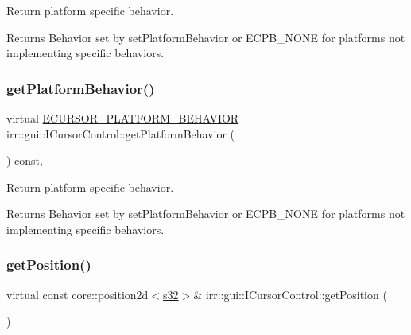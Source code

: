 Return platform specific behavior. 

\begin{DoxyReturn}{Returns}
Behavior set by set\+Platform\+Behavior or E\+C\+P\+B\+\_\+\+N\+O\+NE for platforms not implementing specific behaviors. 
\end{DoxyReturn}
\mbox{\label{classirr_1_1gui_1_1ICursorControl_aad19b5b02de0b8bc476c66b152b745c4}} 
\subsubsection{\texorpdfstring{get\+Platform\+Behavior()}{getPlatformBehavior()}\hspace{0.1cm}{\footnotesize\ttfamily [2/2]}}
{\footnotesize\ttfamily virtual \hyperlink{namespaceirr_1_1gui_abbd186f9cfba2f805d98248df226acef}{E\+C\+U\+R\+S\+O\+R\+\_\+\+P\+L\+A\+T\+F\+O\+R\+M\+\_\+\+B\+E\+H\+A\+V\+I\+OR} irr\+::gui\+::\+I\+Cursor\+Control\+::get\+Platform\+Behavior (\begin{DoxyParamCaption}{ }\end{DoxyParamCaption}) const\hspace{0.3cm}{\ttfamily [inline]}, {\ttfamily [virtual]}}



Return platform specific behavior. 

\begin{DoxyReturn}{Returns}
Behavior set by set\+Platform\+Behavior or E\+C\+P\+B\+\_\+\+N\+O\+NE for platforms not implementing specific behaviors. 
\end{DoxyReturn}
\mbox{\label{classirr_1_1gui_1_1ICursorControl_a65d9f6e734baa02be69b7e9f5fbdd565}} 
\subsubsection{\texorpdfstring{get\+Position()}{getPosition()}\hspace{0.1cm}{\footnotesize\ttfamily [1/2]}}
{\footnotesize\ttfamily virtual const core\+::position2d$<$\hyperlink{namespaceirr_ac66849b7a6ed16e30ebede579f9b47c6}{s32}$>$\& irr\+::gui\+::\+I\+Cursor\+Control\+::get\+Position (\begin{DoxyParamCaption}{ }\end{DoxyParamCaption})\hspace{0.3cm}{\ttfamily [pure virtual]}}



